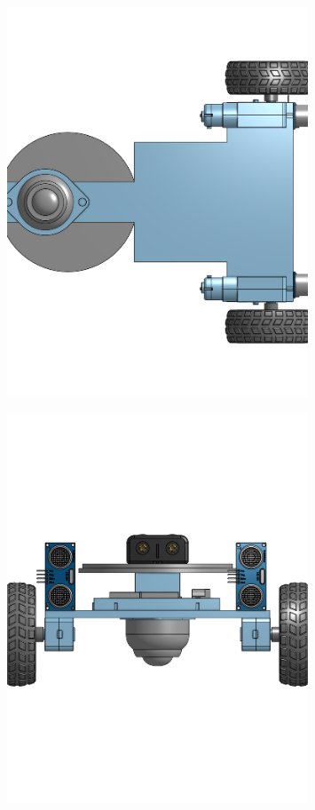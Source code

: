 \documentclass[a4paper,12pt]{article}
\begin{document}
\begin{center}\begin{figure}[H]\centering\includegraphics[width=0.8\textwidth]{./model_images/a7.png}\end{figure}\FloatBarrier\end{center}
\begin{center}\begin{figure}[H]\centering\includegraphics[width=0.8\textwidth]{./model_images/a8.png}\end{figure}\FloatBarrier\end{center}
\end{document}
